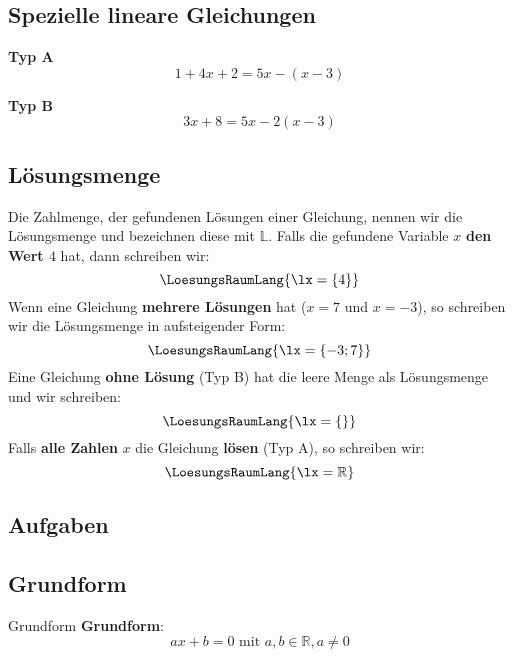 \subsection{Spezielle lineare Gleichungen}
\textbf{Typ A}\\

$$1+4x+2 = 5x - (x-3)$$

\textbf{Typ B}\\

$$3x+8 = 5x-2(x-3)$$


\subsection{Lösungsmenge}
  Die Zahlmenge, der gefundenen Lösungen einer Gleichung, nennen wir
  die Lösungsmenge und bezeichnen diese mit $\mathbb{L}$. Falls die gefundene
  Variable $x$ \zB{} \textbf{den Wert $4$} hat, dann schreiben wir:
  $$\LoesungsRaumLang{\lx=\{4\}}$$
  Wenn eine Gleichung \textbf{mehrere Lösungen} hat (\zB $x=7$ und $x=-3$), so
  schreiben wir die Lösungsmenge in aufsteigender Form:
  $$\LoesungsRaumLang{\lx=\{-3; 7\}}$$
  Eine Gleichung \textbf{ohne Lösung} (Typ B) hat die leere Menge als Lösungsmenge und
  wir schreiben:
  $$\LoesungsRaumLang{\lx=\{\}}$$
  Falls \textbf{alle Zahlen} $x$ die Gleichung \textbf{lösen} (Typ A), so schreiben wir:
  $$\LoesungsRaumLang{\lx=\mathbb{R}}$$

  

\subsection*{Aufgaben}


\newpage


\subsection{Grundform}
\begin{definition}{Grundform}{}
  \textbf{Grundform}:\\
  $$ax+b=0 \text{ mit } a,b\in\mathbb{R}, a\ne 0$$
  
  \end{definition}


